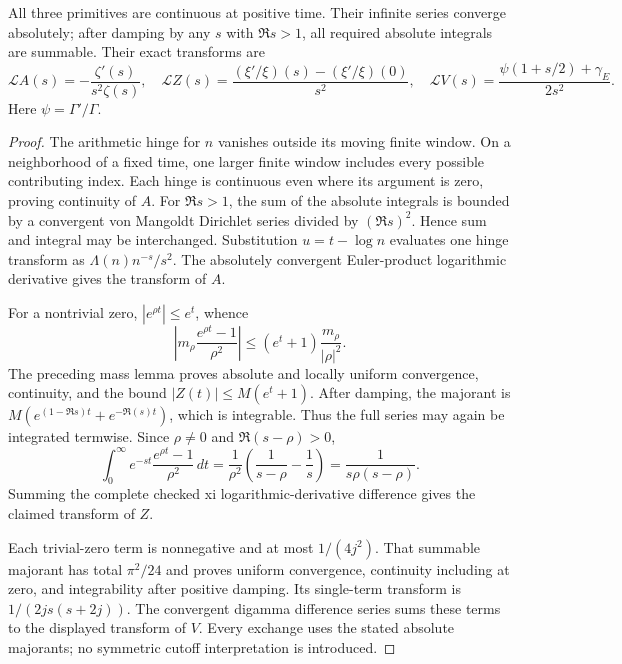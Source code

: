 \begin{lemma}
\label{analytic:primitive-transforms}
\leanok
All three primitives are continuous at positive time.
Their infinite series converge absolutely; after damping by any
$s$ with $\Re s>1$, all required absolute integrals are summable.
Their exact transforms are
\[
 \mathcal LA(s)=-\frac{\zeta'(s)}{s^2\zeta(s)},\quad
 \mathcal LZ(s)=
 \frac{(\xi'/\xi)(s)-(\xi'/\xi)(0)}{s^2},\quad
 \mathcal LV(s)=
 \frac{\psi(1+s/2)+\gamma_E}{2s^2}.
\]
Here $\psi=\Gamma'/\Gamma$.
\end{lemma}
\begin{proof}
The arithmetic hinge for $n$ vanishes outside its moving finite window.
On a neighborhood of a fixed time, one larger finite window includes
every possible contributing index.  Each hinge is continuous even
where its argument is zero, proving continuity of $A$.
For $\Re s>1$, the sum of the absolute integrals is bounded by a
convergent von Mangoldt Dirichlet series divided by $(\Re s)^2$.
Hence sum and integral may be interchanged.  Substitution
$u=t-\log n$ evaluates one hinge transform as
$\Lambda(n)n^{-s}/s^2$.  The absolutely convergent Euler-product
logarithmic derivative gives the transform of $A$.

For a nontrivial zero, $|e^{\rho t}|\le e^t$, whence
\[
 \left|m_\rho\frac{e^{\rho t}-1}{\rho^2}\right|
 \le(e^t+1)\frac{m_\rho}{|\rho|^2}.
\]
The preceding mass lemma proves absolute and locally uniform
convergence, continuity, and the bound $|Z(t)|\le M(e^t+1)$.
After damping, the majorant is
$M(e^{(1-\Re s)t}+e^{-\Re(s)t})$, which is integrable.
Thus the full series may again be integrated termwise.
Since $\rho\ne0$ and $\Re(s-\rho)>0$,
\[
 \int_0^\infty e^{-st}\frac{e^{\rho t}-1}{\rho^2}\,dt
 =\frac1{\rho^2}\left(\frac1{s-\rho}-\frac1s\right)
 =\frac1{s\rho(s-\rho)}.
\]
Summing the complete checked xi logarithmic-derivative difference
gives the claimed transform of $Z$.

Each trivial-zero term is nonnegative and at most $1/(4j^2)$.
That summable majorant has total $\pi^2/24$ and proves uniform
convergence, continuity including at zero, and integrability after
positive damping.  Its single-term transform is
$1/(2js(s+2j))$.  The convergent digamma difference series sums
these terms to the displayed transform of $V$.
Every exchange uses the stated absolute majorants; no symmetric
cutoff interpretation is introduced.
\end{proof}

